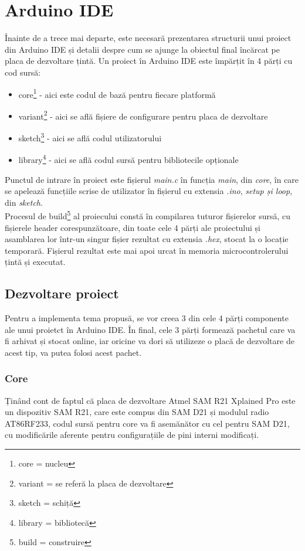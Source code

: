 \documentclass[12pt,a4paper]{report}
\begin{document}
\section{Arduino IDE}
Înainte de a trece mai departe, este necesară prezentarea structurii unui proiect din Arduino IDE și detalii despre cum se ajunge la obiectul final încărcat pe placa de dezvoltare țintă.
Un proiect în Arduino IDE este împărțit în 4 părți cu cod sursă:
\begin{itemize}
	\item{core\footnote{core = nucleu} - aici este codul de bază pentru fiecare platformă}
	\item{variant\footnote{variant = se referă la placa de dezvoltare} - aici se află fișiere de configurare pentru placa de dezvoltare}
	\item{sketch\footnote{sketch = schiță} - aici se află codul utilizatorului}
	\item{library\footnote{library = bibliotecă} - aici se află codul sursă pentru bibliotecile opționale}
\end{itemize}
Punctul de intrare în proiect este fișierul \textit{main.c} în funcția \textit{main}, din \textit{core}, în care se apelează funcțiile scrise de utilizator în fișierul cu extensia \textit{.ino}, \textit{setup și loop}, din \textit{sketch}. \\
Procesul de build\footnote{build = construire} al proiecului constă în compilarea tuturor fișierelor sursă, cu fișierele header corespunzătoare, din toate cele 4 părți ale proiectului și asamblarea lor într-un singur fișier rezultat cu extensia \textit{.hex}, stocat la o locație temporară. Fișierul rezultat este mai apoi urcat în memoria microcontrolerului țintă și executat.

\subsection{Dezvoltare proiect}
Pentru a implementa tema propusă, se vor creea 3 din cele 4 părți componente ale unui proietct în Arduino IDE. În final, cele 3 părți formează pachetul care va fi arhivat și stocat online, iar oricine va dori să utilizeze o placă de dezvoltare de acest tip, va putea folosi acest pachet. \\

\subsubsection{Core}
Ținând cont de faptul că placa de dezvoltare Atmel SAM R21 Xplained Pro este un dispozitiv SAM R21,  care este compus din SAM D21 și modulul radio AT86RF233, codul sursă pentru core va fi asemănător cu cel pentru SAM D21, cu modificările aferente pentru configurațiile de pini interni modificați.
\end{document}
